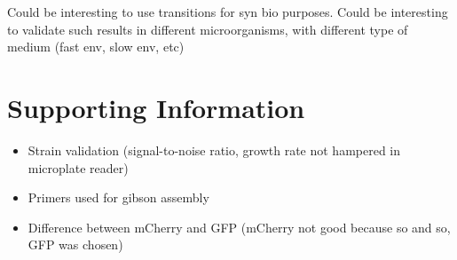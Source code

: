 Could be interesting to use transitions for syn bio purposes.
Could be interesting to validate such results in different microorganisms, with different type of medium (fast env, slow env, etc)

\section{Supporting Information}

\begin{itemize}
\item Strain validation (signal-to-noise ratio, growth rate not hampered in microplate reader)
\item Primers used for gibson assembly
\item Difference between mCherry and GFP (mCherry not good because so and so, GFP was chosen)
\end{itemize}